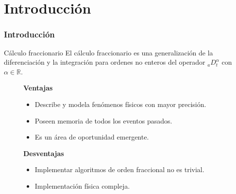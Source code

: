 \documentclass[10pt]{beamer}
\begin{document}
	\section{Introducción}
	\begin{frame}
		\frametitle{Introducción}
		\begin{block}{Cálculo fraccionario}
		\justifying
		El cálculo fraccionario es una generalización de la  diferenciación y la integración para ordenes no enteros del operador $_{a}D_{t}^{\alpha}$ con $\alpha \in \mathbb{R}$. \cite{Petras2011}
			\begin{figure}[!h]
				\begin{minipage}[c]{0.48\textwidth}
					\textbf{Ventajas}
					\begin{itemize}
								\justifying
								\item Describe y modela fenómenos físicos con mayor precisión.
								\item Poseen memoria de todos los eventos pasados.
								\item Es un área de oportunidad emergente.
					\end{itemize}
				\end{minipage} \hfill \begin{minipage}[c]{0.48\textwidth}
					\textbf{Desventajas}
					\begin{itemize}
								\justifying
								\item Implementar algoritmos de orden fraccional no es trivial.
								\item Implementación física compleja.
					\end{itemize}
				\end{minipage}
			\end{figure}		
		\end{block}
	\end{frame}
\end{document}
